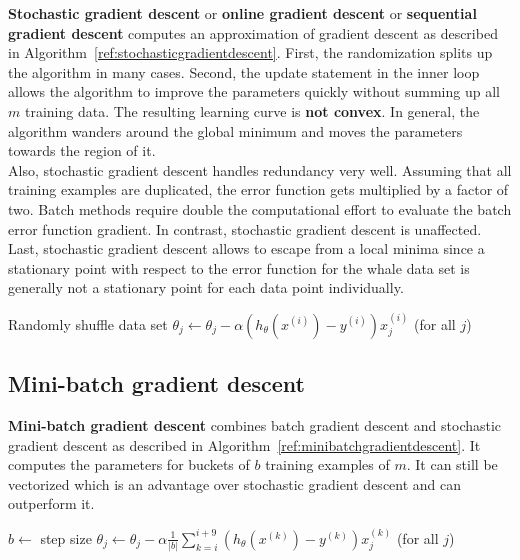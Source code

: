 \documentclass{report}
\begin{document}
{\bf Stochastic gradient descent} or {\bf online gradient descent} or {\bf sequential gradient descent} computes an approximation of gradient descent as described in Algorithm~\ref{ref:stochasticgradientdescent}.
First, the randomization splits up the algorithm in many cases.
Second, the update statement in the inner loop allows the algorithm to improve the parameters quickly without summing up all $m$ training data.
The resulting learning curve is {\bf not convex}.
In general, the algorithm wanders around the global minimum and moves the parameters towards the region of it. \\
Also, stochastic gradient descent handles redundancy very well. Assuming that all training examples are duplicated, the error function gets multiplied by a factor of two. Batch methods require double the computational effort to evaluate the batch error function gradient. In contrast, stochastic gradient descent is unaffected.
Last, stochastic gradient descent allows to escape from a local minima since a stationary point with respect to the error function for the whale data set is generally not a stationary point for each data point individually.

\begin{algorithm}
\caption{Stochastic gradient descent}
\label{ref:stochasticgradientdescent}
\begin{algorithmic}
\State Randomly shuffle data set
\Repeat
{}
\State $\theta_j  \gets \theta_j - \alpha (h_\theta(x^{(i)})-y^{(i)})x_j^{(i)}$ (for all $j$)
\EndFor
{}
\end{algorithmic}
\end{algorithm}


\subsection{Mini-batch gradient descent}
{\bf Mini-batch gradient descent} combines batch gradient descent and stochastic gradient descent as described in Algorithm~\ref{ref:minibatchgradientdescent}. It computes the parameters for buckets of $b$ training examples of $m$. It can still be vectorized which is an advantage over stochastic gradient descent and can outperform it.

\begin{algorithm}
\caption{Mini-batch gradient descent}
\label{ref:minibatchgradientdescent}
\begin{algorithmic}
\State $b\gets $ step size
\Repeat
{}
\State $\theta_j  \gets \theta_j - \alpha \frac{1}{\vert b\vert}\sum_{k=i}^{i+9} (h_\theta(x^{(k)})-y^{(k)})x_j^{(k)}$ (for all $j$)
\EndFor
{}
\end{algorithmic}
\end{algorithm}
\end{document}
